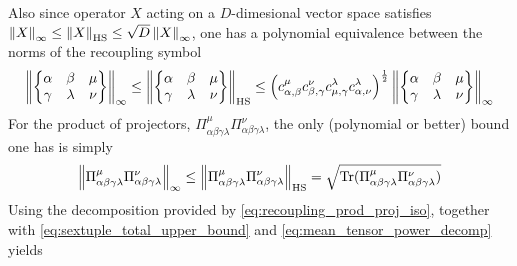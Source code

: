 \documentclass[notitlepage]{article}
\begin{document}
Also since operator $X$ acting on a $D$-dimesional vector space satisfies $\left\lVert X\right\rVert_{\infty} \leq \left\lVert X\right\rVert_{\mathrm{HS}} \leq \sqrt{D}\left\lVert X\right\rVert_{\infty}$, one has a polynomial equivalence between the norms of the recoupling symbol
\begin{equation}
    \left\lVert\begin{Bmatrix}\alpha & \beta & \mu \\ \gamma & \lambda & \nu \end{Bmatrix}\right\rVert_{\infty}
    \leq \left\lVert\begin{Bmatrix}\alpha & \beta & \mu \\ \gamma & \lambda & \nu \end{Bmatrix}\right\rVert_{\mathrm{HS}}
    \leq \left(c_{\alpha,\beta}^{\mu}c_{\beta,\gamma}^{\nu}c_{\mu,\gamma}^{\lambda}c_{\alpha,\nu}^{\lambda}\right)^{\frac{1}{2}}\left\lVert\begin{Bmatrix}\alpha & \beta & \mu \\ \gamma & \lambda & \nu \end{Bmatrix}\right\rVert_{\infty}
\end{equation}
For the product of projectors, $\Pi_{\alpha\beta\gamma\lambda}^{\mu}\Pi_{\alpha\beta\gamma\lambda}^{\nu}$, the only (polynomial or better) bound one has is simply
\begin{equation}
    \left\lVert\Pi_{\alpha\beta\gamma\lambda}^{\mu}\Pi_{\alpha\beta\gamma\lambda}^{\nu}\right\rVert_{\infty} 
    \leq 
    \left\lVert\Pi_{\alpha\beta\gamma\lambda}^{\mu}\Pi_{\alpha\beta\gamma\lambda}^{\nu}\right\rVert_{\mathrm{HS}} 
    = \sqrt{ \operatorname{Tr}(\Pi_{\alpha\beta\gamma\lambda}^{\mu}\Pi_{\alpha\beta\gamma\lambda}^{\nu})}
\end{equation}
Using the decomposition provided by \cref{eq:recoupling_prod_proj_iso}, together with \cref{eq:sextuple_total_upper_bound} and \cref{eq:mean_tensor_power_decomp} yields
\end{document}
